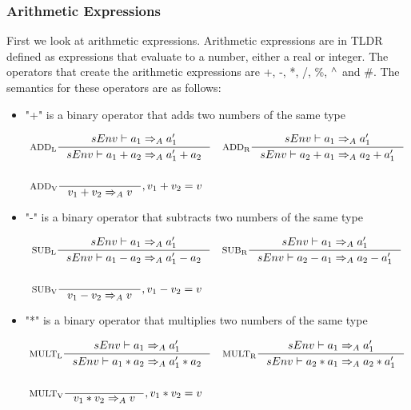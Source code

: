 \subsubsection{Arithmetic Expressions}

First we look at arithmetic expressions. Arithmetic expressions are in TLDR defined as expressions that evaluate to a number, either a real or integer. The operators that create the arithmetic expressions are +, -, *, /, \%, $^\wedge{}$ and \#. The semantics for these operators are as follows:

\begin{itemize}
\item "+" is a binary operator that adds two numbers of the same type

\begin{align*}
&\inference[$\text{ADD}_\text{L}$]{sEnv \vdash a_1 \Rightarrow_A a_1'}
                    {sEnv \vdash  a_1 + a_2 \Rightarrow_A a_1' + a_2}
&
&\inference[$\text{ADD}_\text{R}$]{sEnv\vdash a_1 \Rightarrow_A a_1'}
                    {sEnv\vdash a_2 + a_1 \Rightarrow_A a_2 + a_1'}
\\\\
&\inference[$\text{ADD}_\text{V}$]{}
                    {v_1 + v_2 \Rightarrow_A v}
                    {, v_1 + v_2 = v}
\end{align*}

\item "-" is a binary operator that subtracts two numbers of the same type

\begin{align*}
&\inference[$\text{SUB}_\text{L}$]{sEnv\vdash a_1 \Rightarrow_A a_1'}
                    {sEnv\vdash a_1 - a_2 \Rightarrow_A a_1' - a_2}
&
&\inference[$\text{SUB}_\text{R}$]{sEnv\vdash a_1 \Rightarrow_A a_1'}
                    {sEnv\vdash a_2 - a_1 \Rightarrow_A a_2 - a_1'}
\\\\
&\inference[$\text{SUB}_\text{V}$]{}
                    {v_1 - v_2 \Rightarrow_A v}
                    {, v_1 - v_2 = v}
\end{align*}

\item "*" is a binary operator that multiplies two numbers of the same type

\begin{align*}
&\inference[$\text{MULT}_\text{L}$]{sEnv\vdash a_1 \Rightarrow_A a_1'}
                     {sEnv\vdash a_1 * a_2 \Rightarrow_A a_1' * a_2}
&
&\inference[$\text{MULT}_\text{R}$]{sEnv\vdash a_1 \Rightarrow_A a_1'}
                     {sEnv\vdash a_2 * a_1 \Rightarrow_A a_2 * a_1'}
\\\\
&\inference[$\text{MULT}_\text{V}$]{}
                     {v_1 * v_2 \Rightarrow_A v}
                     {, v_1 * v_2 = v}
\end{align*}


\end{itemize}
